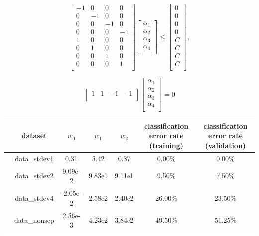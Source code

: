 \documentclass[10pt]{article}
\begin{document}
\[
\begin{bmatrix}
    -1 & 0 & 0 & 0 \\
    0 & -1 & 0 & 0 \\
    0 & 0 & -1 & 0 \\
    0 & 0 & 0 & -1 \\
    1 & 0 & 0 &0 \\
    0 & 1 & 0 & 0 \\
    0 & 0 & 1 & 0 \\
    0 & 0 & 0 & 1 \\
\end{bmatrix}
\begin{bmatrix}
    \alpha_1 \\
    \alpha_2 \\
    \alpha_3 \\
    \alpha_4 \\
\end{bmatrix} 
\leq
\begin{bmatrix}
0 \\
0 \\ 
0 \\ 
0 \\ 
C \\
C \\ 
C \\ 
C \\
\end{bmatrix},
\]

\[
\begin{bmatrix}
    1 & 1 & -1 & -1 \\
\end{bmatrix}
\begin{bmatrix}
    \alpha_1 \\
    \alpha_2 \\
    \alpha_3 \\
    \alpha_4 \\
\end{bmatrix} 
= 0
\]

\begin{table}
\begin{tabular}{c c|c|c|c|c|c}
\toprule
{} & dataset & $w_0$ & $w_1$ & $w_2$ & classification error rate (training) & classification error rate (validation) \\
\midrule
  & data\_stdev1 & 0.31 & 5.42 & 0.87 & 0.00\% & 0.00\% \\
  & data\_stdev2 & 9.09e-2 & 9.83e1 & 9.11e1 & 9.50\% & 7.50\% \\
  & data\_stdev4 & -2.05e-2 & 2.58e2 & 2.40e2 & 26.00\% & 23.50\% \\
  & data\_nonsep & 2.56e-3 & 4.23e2 & 3.84e2 & 49.50\% & 51.25\% \\
\bottomrule
\end{tabular}
\end{table}
\end{document}
